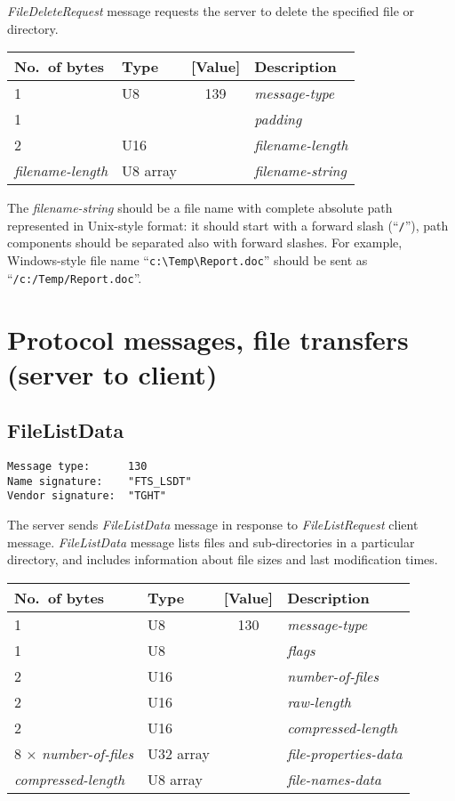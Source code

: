 \documentclass[a4paper]{article}
\newcommand{\typestr}[1]{\textit{#1}}
\begin{document}
\typestr{FileDeleteRequest} message requests the server to delete the
specified file or directory.

\begin{tabular}{l|lc|l} \hline
No.\ of bytes & Type & [Value] & Description \\ \hline
1 & U8  & 139 & \typestr{message-type} \\
1 &     &     & \typestr{padding} \\
2 & U16 &     & \typestr{filename-length} \\
\typestr{filename-length} & U8 array & & \typestr{filename-string} \\
\hline\end{tabular}

The \typestr{filename-string} should be a file name with complete
absolute path represented in Unix-style format: it should start with a
forward slash (``\verb|/|''), path components should be separated also
with forward slashes. For example, Windows-style file name
``\verb|c:\Temp\Report.doc|'' should be sent as
``\verb|/c:/Temp/Report.doc|''.

\newpage
\section{Protocol messages, file transfers (server to client)}

\subsection{FileListData}
\begin{verbatim}
Message type:      130
Name signature:    "FTS_LSDT"
Vendor signature:  "TGHT"
\end{verbatim}

The server sends \typestr{FileListData} message in response to
\typestr{FileListRequest} client message. \typestr{FileListData}
message lists files and sub-directories in a particular directory, and
includes information about file sizes and last modification times.

\begin{tabular}{l|lc|l} \hline
No.\ of bytes & Type & [Value] & Description \\ \hline
1 & U8  & 130 & \typestr{message-type} \\
1 & U8  &     & \typestr{flags} \\
2 & U16 &     & \typestr{number-of-files} \\
2 & U16 &     & \typestr{raw-length} \\
2 & U16 &     & \typestr{compressed-length} \\
8 $\times$ \typestr{number-of-files} & U32 array & & \typestr{file-properties-data} \\
\typestr{compressed-length} & U8 array & & \typestr{file-names-data} \\
\hline\end{tabular}
\end{document}
